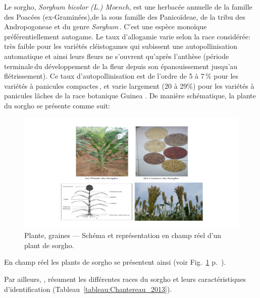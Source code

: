 \documentclass[a4paper,11pt]{article}
\begin{document}
Le sorgho, \emph{Sorghum bicolor (L.) Moench}, est une herbacée
annuelle de la famille des Poacées (ex-Graminées),de la sous famille
des Panicoïdeae, de la tribu des Andropogoneae et du genre
\emph{Sorghum}\,\cite{Doggett_1988}.  C'est une espèce monoïque
préférentiellement autogame. Le taux d'allogamie varie selon la race
considérée: très faible pour les variétés cléistogames qui subissent
une autopollinisation automatique et ainsi leurs fleurs ne s'ouvrent
qu'après l'anthèse (période terminale\,du développement de la fleur
depuis son épanouissement jusqu'au flétrissement). Ce taux
d'autopollinisation est de l'ordre de 5 à 7\,\% pour les variétés à
panicules compactes\,\cite{Doggett_1988}, et varie largement (20 à
29\%) pour les variétés à panicules lâches de la race botanique
Guinea \cite{Ollitrault_1987,Chantereau_1994}. De manière
schématique, la plante du sorgho se présente comme suit:


 
\begin{figure}%
  \begin{center}
    \includegraphics[width=16cm]{images/SchemaComposePage5}
  \end{center}
  \caption{Plante, graines --- Schéma et représentation en champ réel d'un plant de sorgho.}
   \label{fig-SchemaComposePage5}
\end{figure}

En champ réel les plants de sorgho se présentent ainsi (voir
Fig.~\ref{fig-SchemaComposePage5}
p.~\pageref{fig-SchemaComposePage5}).


Par ailleurs, , résument les différentes races du sorgho et
leurs caractéristiques d'identification (Tableau~\ref{tableau:Chantereau_2013}).
\end{document}
